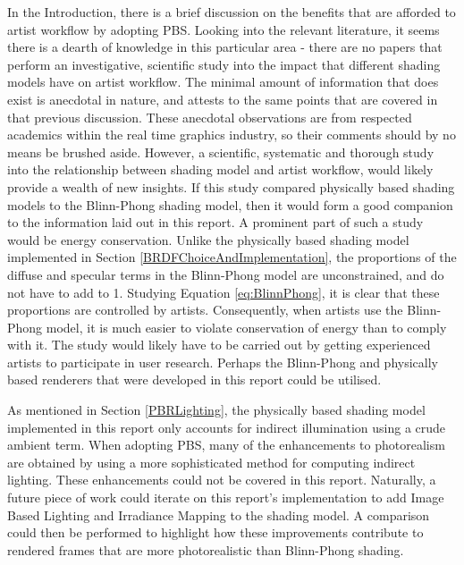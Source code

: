 In the Introduction, there is a brief discussion on the benefits that are afforded to artist workflow by adopting PBS. Looking into the relevant literature, it seems there is a dearth of knowledge in this particular area - there are no papers that perform an investigative, scientific study into the impact that different shading models have on artist workflow. The minimal amount of information that does exist is anecdotal in nature, and attests to the same points that are covered in that previous discussion. These anecdotal observations are from respected academics within the real time graphics industry, so their comments should by no means be brushed aside. However, a scientific, systematic and thorough study into the relationship between shading model and artist workflow, would likely provide a wealth of new insights. If this study compared physically based shading models to the Blinn-Phong shading model, then it would form a good companion to the information laid out in this report. A prominent part of such a study would be energy conservation. Unlike the physically based shading model implemented in Section \ref{BRDFChoiceAndImplementation}, the proportions of the diffuse and specular terms in the Blinn-Phong model are unconstrained, and do not have to add to 1. Studying Equation \ref{eq:BlinnPhong}, it is clear that these proportions are controlled by artists. Consequently, when artists use the Blinn-Phong model, it is much easier to violate conservation of energy than to comply with it. The study would likely have to be carried out by getting experienced artists to participate in user research. Perhaps the Blinn-Phong and physically based renderers that were developed in this report could be utilised.

As mentioned in Section \ref{PBRLighting}, the physically based shading model implemented in this report only accounts for indirect illumination using a crude ambient term. When adopting PBS, many of the enhancements to photorealism are obtained by using a more sophisticated method for computing indirect lighting. These enhancements could not be covered in this report. Naturally, a future piece of work could iterate on this report's implementation to add Image Based Lighting and Irradiance Mapping to the shading model. A comparison could then be performed to highlight how these improvements contribute to rendered frames that are more photorealistic than Blinn-Phong shading.